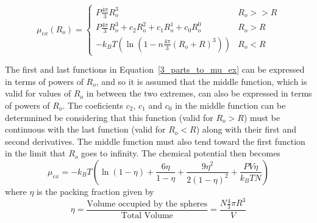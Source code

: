 \documentclass[12pt]{article}
\begin{document}
\begin{equation}\label{3_parts_to_mu_ex}{\mu_{ex}(R_o)=\left\{ \begin{array}{rc} P\frac{4\pi}{3}R_o^3 & R_o >> R 
\\ P\frac{4\pi}{3}R_o^3 + c_2R_o^2 + c_1R_o^1 + c_0R_o^0  & R_o > R \\ -k_BT(\ln(1-n\frac{4\pi}{3}(R_o+R)^3)) & R_o < R\end{array}\right.}\end{equation}


The first and last functions in Equation~\ref{3_parts_to_mu_ex} can be expressed in terms of powers of $R_o$, 
and so it is assumed that the middle function, which is valid for values of $R_o$ in between the two extremes, 
can also be expressed in terms of powers of $R_o$.  
The coeficients $c_2$, $c_1$ and $c_0$ in the middle function can be determnined be considering that this function (valid for $R_o > R$) 
must be continuous with the last function (valid for $R_o < R$) along with their first and second derivatives. 
The middle function must also tend toward the first function in the limit that $R_o$ goes to infinity. The chemical potential then becomes
\begin{equation}\mu_{ex}=-k_BT\left(\ln(1-\eta) + \frac{6\eta}{1-\eta}+\frac{9\eta^2}{2(1-\eta)^2}+\frac{PV\eta}{k_BTN}\right)\end{equation}
where $\eta$ is the packing fraction given by
\begin{displaymath}\eta = \frac{\mbox{Volume occupied by the spheres}}{\mbox{Total Volume}}=\frac{N\frac{4}{3}\pi{R}^3}{V}\end{displaymath} 

\end{document}
